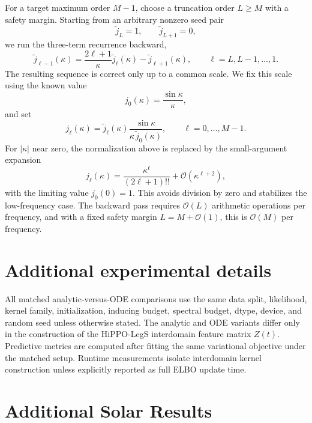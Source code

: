 \documentclass{article}
\theoremstyle{plain}
\theoremstyle{definition}
\theoremstyle{remark}
\begin{document}
For a target maximum order \(M-1\), choose a truncation order \(L\ge M\) with a safety margin. Starting from an arbitrary nonzero seed pair
\[
\tilde j_L=1,
\qquad
\tilde j_{L+1}=0,
\]
we run the three-term recurrence backward,
\[
\tilde j_{\ell-1}(\kappa)
=
\frac{2\ell+1}{\kappa}\tilde j_{\ell}(\kappa)
-
\tilde j_{\ell+1}(\kappa),
\qquad
\ell=L,L-1,\ldots,1.
\]
The resulting sequence is correct only up to a common scale. We fix this scale using the known value
\[
j_0(\kappa)=\frac{\sin \kappa}{\kappa},
\]
and set
\[
j_\ell(\kappa)
=
\tilde j_\ell(\kappa)
\frac{\sin \kappa}{\kappa\,\tilde j_0(\kappa)},
\qquad
\ell=0,\ldots,M-1.
\]
For \(|\kappa|\) near zero, the normalization above is replaced by the small-argument expansion
\[
j_\ell(\kappa)
=
\frac{\kappa^\ell}{(2\ell+1)!!}
+
\mathcal{O}(\kappa^{\ell+2}),
\]
with the limiting value \(j_0(0)=1\). This avoids division by zero and stabilizes the low-frequency case. The backward pass requires \(\mathcal{O}(L)\) arithmetic operations per frequency, and with a fixed safety margin \(L=M+\mathcal{O}(1)\), this is \(\mathcal{O}(M)\) per frequency.

\section{Additional experimental details}
\label{app:experimental-details}

All matched analytic-versus-ODE comparisons use the same data split, likelihood, kernel family, initialization, inducing budget, spectral budget, dtype, device, and random seed unless otherwise stated. The analytic and ODE variants differ only in the construction of the HiPPO-LegS interdomain feature matrix \(Z(t)\). Predictive metrics are computed after fitting the same variational objective under the matched setup. Runtime measurements isolate interdomain kernel construction unless explicitly reported as full ELBO update time.

\section{Additional Solar Results}
\label{app:solar-results}
\end{document}

